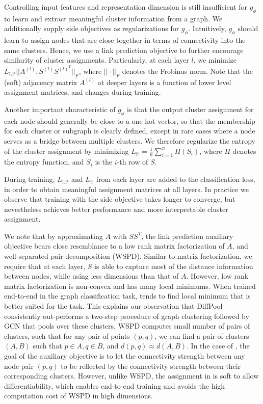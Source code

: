 {
Controlling input features and representation dimension is still insufficient for $g_\phi$ to learn and extract meaningful cluster information from a graph. We additionally supply side objectives as regularizations for $g_\phi$. 
Intuitively, $g_\phi$ should learn to assign nodes that are close together in terms of connectivity into the same clusters. 
Hence, we use a link prediction objective to further encourage similarity of cluster assignments.
Particularly, at each layer $l$, we minimize
$L_{\text{LP}} ||A^{(l)}, S^{(l)} S^{{(l)}^T}||_F$, where $||\cdot||_F$ denotes the Frobinus norm. 
Note that the (soft) adjacency matrix $A^{(l)}$ at deeper layers is a function of lower level assignment matrices, and changes during training. 

Another important characteristic of $g_\phi$ is that the output cluster assignment for each node should generally be close to a one-hot vector, so that the membership for each cluster or subgraph is clearly defined, except in rare cases where a node serves as a bridge between multiple clusters. We therefore regularize the entropy of the cluster assignment by minimizing $L_{\text{E}} = \frac{1}{n} \sum_{i=1}^n H(S_i)$, where $H$ denotes the entropy function, and $S_i$ is the $i$-th row of $S$.

During training, $L_{\text{LP}}$ and $L_{\text{E}}$ from each layer are added to the classification loss, in order to obtain meaningful assignment matrices at all layers. In practice we observe that training with the side objective takes longer to converge, but nevertheless achieves better performance and more interpretable cluster assignment.


We note that by approximating $A$ with $S S^T$, the link prediction auxiliary objective bears close resemblance to a low rank matrix factorization of $A$, and well-separated pair decomposition (WSPD). 
Similar to matrix factorization, we require that at each layer, $S$ is able to capture most of the distance information between nodes, while using less dimensions than that of $A$. However, low rank matrix factorization is non-convex and has many local minimums. When trained end-to-end in the graph classification task, \name tends to find local minimum that is better suited for the task. This explains our observation that DiffPool consistently out-performs a two-step procedure of graph clustering followed by GCN that pools over these clusters.
$\mathrm{WSPD}$ computes small number of pairs of clusters, such that for any pair of points $(p, q)$, we can find a pair of clusters $(A, B)$ such that $p\in A, q\in B$, and $d(p, q) \approx d(A, B)$. In the case of \name, the goal of the auxiliary objective is to let the connectivity strength between any node pair $(p, q)$ to be reflected by the connectivity strength between their corresponding clusters. However, unlike WSPD, the assignment in \name is soft to allow differentiability, which enables end-to-end training and avoids the high computation cost of WSPD in high dimensions.


}
